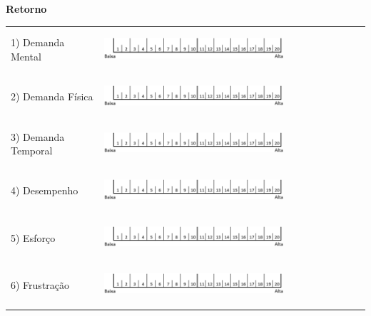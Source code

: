 \textbf{Retorno}

\begin{table}[!h]
\centering
    \def\arraystretch{0.5}
    \begin{tabular}{m{} m{}}
        1) Demanda Mental & \begin{center}\includegraphics[width = 0.7\textwidth]{ApendC_(Questionarios)/Escala_NASA.png}\end{center}\\
        2) Demanda Física & \begin{center}\includegraphics[width = 0.7\textwidth]{ApendC_(Questionarios)/Escala_NASA.png}\end{center}\\
        3) Demanda Temporal & \begin{center}\includegraphics[width = 0.7\textwidth]{ApendC_(Questionarios)/Escala_NASA.png}\end{center}\\
        4) Desempenho     & \begin{center}\includegraphics[width = 0.7\textwidth]{ApendC_(Questionarios)/Escala_NASA.png}\end{center}\\
        5) Esforço        & \begin{center}\includegraphics[width = 0.7\textwidth]{ApendC_(Questionarios)/Escala_NASA.png}\end{center}\\
        6) Frustração     & \begin{center}\includegraphics[width = 0.7\textwidth]{ApendC_(Questionarios)/Escala_NASA.png}\end{center}\\
    \end{tabular}
\end{table}

\pagebreak